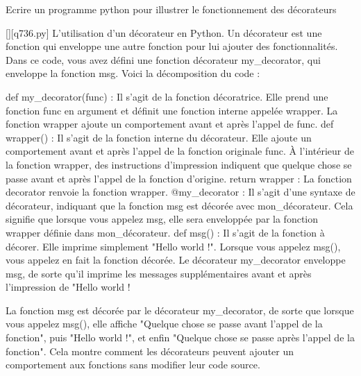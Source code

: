         \question
        Ecrire un programme python pour illustrer le fonctionnement des décorateurs
        \par
        \begin{solution}
            \renewcommand{\nomfichier}{q736.py}
            \pythonfile{\chemincode \nomfichier}[][\nomfichier]
            L'utilisation d'un décorateur en Python. Un décorateur est une fonction qui enveloppe une autre fonction pour lui ajouter des fonctionnalités. Dans ce code, vous avez défini une fonction décorateur my\_decorator, qui enveloppe la fonction msg. Voici la décomposition du code :

    def my\_decorator(func) : Il s'agit de la fonction décoratrice. Elle prend une fonction func en argument et définit une fonction interne appelée wrapper. La fonction wrapper ajoute un comportement avant et après l'appel de func.
    def wrapper() : Il s'agit de la fonction interne du décorateur. Elle ajoute un comportement avant et après l'appel de la fonction originale func.
    À l'intérieur de la fonction wrapper, des instructions d'impression indiquent que quelque chose se passe avant et après l'appel de la fonction d'origine.
    return wrapper : La fonction decorator renvoie la fonction wrapper.
    @my\_decorator : Il s'agit d'une syntaxe de décorateur, indiquant que la fonction msg est décorée avec mon\_décorateur. Cela signifie que lorsque vous appelez msg, elle sera enveloppée par la fonction wrapper définie dans mon\_décorateur.
    def msg() : Il s'agit de la fonction à décorer. Elle imprime simplement "Hello world !".
    Lorsque vous appelez msg(), vous appelez en fait la fonction décorée. Le décorateur my\_decorator enveloppe msg, de sorte qu'il imprime les messages supplémentaires avant et après l'impression de "Hello world !

La fonction msg est décorée par le décorateur my\_decorator, de sorte que lorsque vous appelez msg(), elle affiche "Quelque chose se passe avant l'appel de la fonction", puis "Hello world !", et enfin "Quelque chose se passe après l'appel de la fonction". Cela montre comment les décorateurs peuvent ajouter un comportement aux fonctions sans modifier leur code source.
        \end{solution}
        

